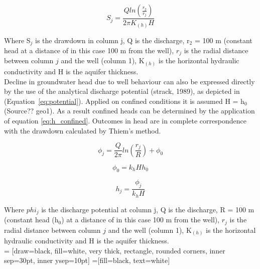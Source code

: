 \begin{equation}
 S_j = \frac{Q ln(\frac{r_{2}}{r_{j}})}{2\pi K_{(h)}H}
 \label{eq:thiem}
 \end{equation} 

Where S$_j$ is the drawdown in column j, Q is the discharge, r$_2$ = 100 m (constant head at a distance of in this case 100 m from the well), $r_j$ is the radial distance between column $j$ and the well (column 1), K$_{(h)}$ is the horizontal hydraulic conductivity and H is the aquifer thickness.\\

Decline in groundwater head due to well behaviour can also be expressed directly by the use of the analytical discharge potential (strack, 1989), as depicted in (Equation~\ref{eq:potential}). Applied on confined conditions it is assumed H = h$_0$ (Source?? geo1). As a result confined heads can be determined by the application of equation \ref{eq:h_confined}. Outcomes in head are in complete correspondence with the drawdown calculated by Thiem's method. 

\begin{equation}
 \phi_j = \frac{Q}{2\pi} ln(\frac{r_j}{R}) + \phi_0
 \label{eq:potential}
\end{equation}  

\begin{equation}
 \phi_0 = k_{h}Hh_0
 \label{eq:pot_confined}
\end{equation}  

\begin{equation}
 h_j = \frac{\phi_j}{k_{h}H} 
 \label{eq:h_confined}
\end{equation}  

Where $phi_j$ is the discharge potential at column j, Q is the discharge, R = 100 m (constant head (h$_0$) at a distance of in this case 100 m from the well), $r_j$ is the radial distance between column $j$ and the well (column 1), K$_{(h)}$ is the horizontal hydraulic conductivity and H is the aquifer thickness.\\

 = [draw=black, fill=white, very thick,
    rectangle, rounded corners, inner sep=30pt, inner ysep=10pt]
 =[fill=black, text=white]


